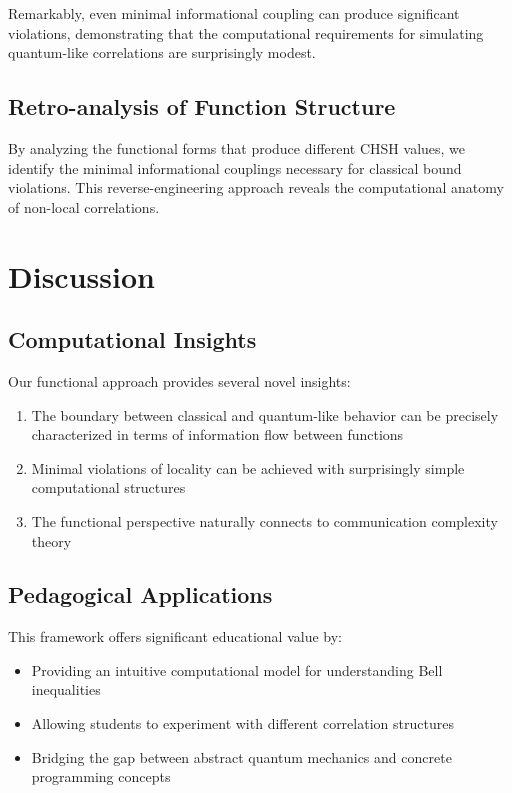 \documentclass[11pt,a4paper]{article}
\begin{document}
Remarkably, even minimal informational coupling can produce significant violations, demonstrating that the computational requirements for simulating quantum-like correlations are surprisingly modest.

\subsection{Retro-analysis of Function Structure}

By analyzing the functional forms that produce different CHSH values, we identify the minimal informational couplings necessary for classical bound violations. This reverse-engineering approach reveals the computational anatomy of non-local correlations.

\section{Discussion}

\subsection{Computational Insights}

Our functional approach provides several novel insights:

\begin{enumerate}
\item The boundary between classical and quantum-like behavior can be precisely characterized in terms of information flow between functions
\item Minimal violations of locality can be achieved with surprisingly simple computational structures
\item The functional perspective naturally connects to communication complexity theory~\cite{toner2003}
\end{enumerate}

\subsection{Pedagogical Applications}

This framework offers significant educational value by:

\begin{itemize}
\item Providing an intuitive computational model for understanding Bell inequalities
\item Allowing students to experiment with different correlation structures
\item Bridging the gap between abstract quantum mechanics and concrete programming concepts
\end{itemize}
\end{document}
